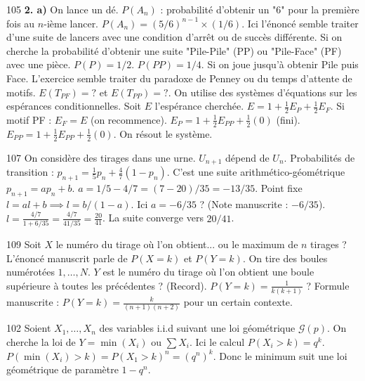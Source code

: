 \begin{correction}{105}
\textbf{2. a)} On lance un dé.
$P(A_n)$ : probabilité d'obtenir un "6" pour la première fois au $n$-ième lancer.
$P(A_n) = (5/6)^{n-1} \times (1/6)$.
Ici l'énoncé semble traiter d'une suite de lancers avec une condition d'arrêt ou de succès différente.
Si on cherche la probabilité d'obtenir une suite "Pile-Pile" (PP) ou "Pile-Face" (PF) avec une pièce.
$P(P) = 1/2$.
$P(PP) = 1/4$.
Si on joue jusqu'à obtenir Pile puis Face.
L'exercice semble traiter du paradoxe de Penney ou du temps d'attente de motifs.
$E(T_{PF}) = ?$ et $E(T_{PP}) = ?$.
On utilise des systèmes d'équations sur les espérances conditionnelles.
Soit $E$ l'espérance cherchée.
$E = 1 + \frac{1}{2} E_P + \frac{1}{2} E_F$.
Si motif PF :
$E_F = E$ (on recommence).
$E_P = 1 + \frac{1}{2} E_{PP} + \frac{1}{2} (0)$ (fini).
$E_{PP} = 1 + \frac{1}{2} E_{PP} + \frac{1}{2} (0)$.
On résout le système.
\end{correction}

\begin{correction}{107}
On considère des tirages dans une urne.
$U_{n+1}$ dépend de $U_n$.
Probabilités de transition : $p_{n+1} = \frac{1}{5} p_n + \frac{4}{7} (1-p_n)$.
C'est une suite arithmético-géométrique $p_{n+1} = a p_n + b$.
$a = 1/5 - 4/7 = (7-20)/35 = -13/35$.
Point fixe $l = a l + b \implies l = b/(1-a)$.
Ici $a = -6/35$ ? (Note manuscrite : $-6/35$).
$l = \frac{4/7}{1+6/35} = \frac{4/7}{41/35} = \frac{20}{41}$.
La suite converge vers $20/41$.
\end{correction}

\begin{correction}{109}
Soit $X$ le numéro du tirage où l'on obtient... ou le maximum de $n$ tirages ?
L'énoncé manuscrit parle de $P(X=k)$ et $P(Y=k)$.
On tire des boules numérotées $1, \dots, N$.
$Y$ est le numéro du tirage où l'on obtient une boule supérieure à toutes les précédentes ? (Record).
$P(Y=k) = \frac{1}{k(k+1)}$ ?
Formule manuscrite : $P(Y=k) = \frac{k}{(n+1)(n+2)}$ pour un certain contexte.
\end{correction}

\begin{correction}{102}
Soient $X_1, \dots, X_n$ des variables i.i.d suivant une loi géométrique $\mathcal{G}(p)$.
On cherche la loi de $Y = \min(X_i)$ ou $\sum X_i$.
Ici le calcul $P(X_i > k) = q^k$.
$P(\min(X_i) > k) = P(X_1 > k)^n = (q^n)^k$.
Donc le minimum suit une loi géométrique de paramètre $1-q^n$.
\end{correction}

